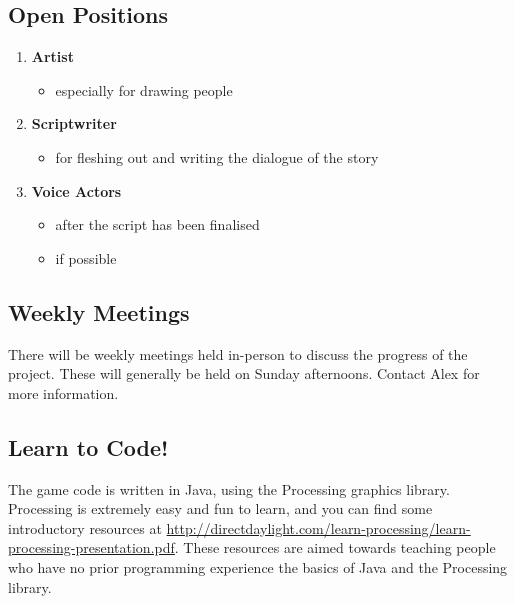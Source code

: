 \documentclass[11pt]{article}
\begin{document}
\subsection{Open Positions}
\begin{enumerate}
\item \textbf{Artist}
\begin{itemize}
\item especially for drawing people
\end{itemize}
\item \textbf{Scriptwriter}
\begin{itemize}
\item for fleshing out and writing the dialogue of the story
\end{itemize}
\item \textbf{Voice Actors}
\begin{itemize}
\item after the script has been finalised
\item if possible
\end{itemize}
\end{enumerate}
\subsection{Weekly Meetings}
There will be weekly meetings held in-person to discuss the progress of the project. These will generally be held on Sunday afternoons. Contact Alex for more information.
\subsection{Learn to Code!}
The game code is written in Java, using the Processing graphics library. Processing is extremely easy and fun to learn, and you can find some introductory resources at \url{http://directdaylight.com/learn-processing/learn-processing-presentation.pdf}. These resources are aimed towards teaching people who have no prior programming experience the basics of Java and the Processing library.
\end{document}
